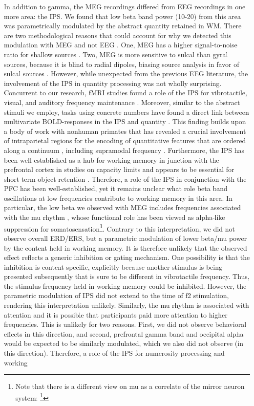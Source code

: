 In addition to gamma, the MEG recordings differed from EEG recordings in one more area: the IPS. We found that low beta band power (10-20) from this area was parametrically modulated by the abstract quantity retained in WM. There are two methodological reasons that could account for why we detected this modulation with MEG and not EEG \parencite[cf.][]{Spitzer2014}. One, MEG has a higher signal-to-noise ratio for shallow sources \parencite{Goldenholz2009}. Two, MEG is more sensitive to sulcal than gyral sources, because it is blind to radial dipoles, biasing source analysis in favor of sulcal sources \parencite{Ahlfors2010}. However, while unexpected from the previous EEG literature, the involvement of the IPS in quantity processing was not wholly surprising. Concurrent to our research, fMRI studies found a role of the IPS for vibrotactile, visual, and auditory frequency maintenance \parencite{Uluc2018,Wu2018}. Moreover, similar to the abstract stimuli we employ, tasks using concrete numbers have found a direct link between multivariate BOLD-responses in the IPS and quantity \parencite{Eger2009}. This finding builds upon a body of work with nonhuman primates that has revealed a crucial involvement of intraparietal regions for the encoding of quantitative features that are ordered along a continuum \parencite{Jacob2012,Nieder2016}, including supramodal frequency \parencite{Vergara2016}. Furthermore, the IPS has been well-established as a hub for working memory in junction with the prefrontal cortex in studies on capacity limits and appears to be essential for short term object retention \parencite{Todd2004,Todd2005,Vogel2004,Xu2006}. Therefore, a role of the IPS in conjunction with the PFC has been well-established, yet it remains unclear what role beta band oscillations at low frequencies contribute to working memory in this area. In particular, the low beta we observed with MEG includes frequencies associated with the mu rhythm \parencite{Chatrian1959,Gastaut1954}, whose functional role has been viewed as alpha-like suppression for somatosensation\footnote{Note that there is a different view on mu as a correlate of the mirror neuron system: \footcite{Naeem2012,Pineda2005}}. Contrary to this interpretation, we did not observe overall ERD/ERS, but a parametric modulation of lower beta/mu power by the content held in working memory. It is therefore unlikely that the observed effect reflects a generic inhibition or gating mechanism. One possibility is that the inhibition is content specific, explicitly because another stimulus is being presented subsequently that is sure to be different in vibrotactile frequency. Thus, the stimulus frequency held in working memory could be inhibited. However, the parametric modulation of IPS did not extend to the time of f2 stimulation, rendering this interpretation unlikely. Similarly, the mu rhythm is associated with attention \parencite{Anderson2011} and it is possible that participants paid more attention to higher frequencies. This is unlikely for two reasons. First, we did not observe behavioral effects in this direction, and second, prefrontal gamma band and occipital alpha would be expected to be similarly modulated, which we also did not observe (in this direction). Therefore, a role of the IPS for numerosity processing and working 